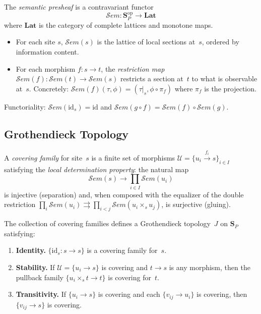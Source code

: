 \documentclass[acmsmall,screen,review,anonymous]{acmart}
\theoremstyle{remark}
\newcommand{\Sem}{\mathcal{S}\mathit{em}}
\newcommand{\Lat}{\mathbf{Lat}}
\newcommand{\op}{\mathrm{op}}
\begin{document}
\begin{definition}\label{def:sem-presheaf}
The \emph{semantic presheaf} is a contravariant functor
\[
  \Sem : \mathbf{S}_P^{\op} \longrightarrow \Lat
\]
where $\Lat$ is the category of complete lattices and monotone maps.
\begin{itemize}[nosep]
  \item For each site $s$, $\Sem(s)$ is the lattice of local sections
    at~$s$, ordered by information content.
  \item For each morphism $f : s \to t$, the \emph{restriction map}
    $\Sem(f) : \Sem(t) \to \Sem(s)$ restricts a section at~$t$ to
    what is observable at~$s$.  Concretely: $\Sem(f)(\tau, \phi)
    = (\tau|_s, \phi \circ \pi_f)$ where $\pi_f$ is the projection.
\end{itemize}
Functoriality: $\Sem(\mathrm{id}_s) = \mathrm{id}$ and
$\Sem(g \circ f) = \Sem(f) \circ \Sem(g)$.
\end{definition}

\subsection{Grothendieck Topology}\label{sec:topology}

\begin{definition}\label{def:cover}
A \emph{covering family} for site~$s$ is a finite set of morphisms
$\mathcal{U} = \{ u_i \xrightarrow{f_i} s \}_{i \in I}$ satisfying
the \emph{local determination property}: the natural map
\[
  \Sem(s) \longrightarrow \prod_{i \in I} \Sem(u_i)
\]
is injective (separation) and, when composed with the equalizer
of the double restriction
$\prod_i \Sem(u_i) \rightrightarrows \prod_{i<j} \Sem(u_i \times_s u_j)$,
is surjective (gluing).
\end{definition}

\begin{definition}%
\label{def:grothendieck}
The collection of covering families defines a Grothendieck topology~$J$
on $\mathbf{S}_P$ satisfying:
\begin{enumerate}[nosep]
  \item \textbf{Identity.}
    $\{ \mathrm{id}_s : s \to s \}$ is a covering family for~$s$.
  \item \textbf{Stability.}
    If $\mathcal{U} = \{ u_i \to s \}$ is covering and $t \to s$ is any
    morphism, then the pullback family
    $\{ u_i \times_s t \to t \}$ is covering for~$t$.
  \item \textbf{Transitivity.}
    If $\{ u_i \to s \}$ is covering and each $\{ v_{ij} \to u_i \}$
    is covering, then $\{ v_{ij} \to s \}$ is covering.
\end{enumerate}
\end{definition}
\end{document}
